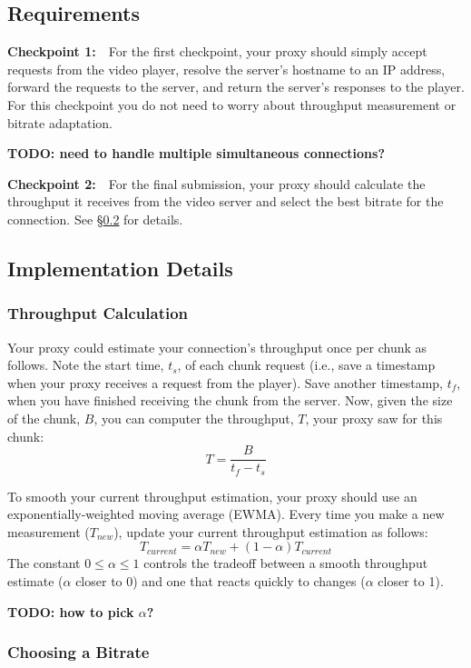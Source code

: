 \documentclass{article}
\begin{document}
\subsection{Requirements}

\bigskip \noindent \textbf{Checkpoint 1:}~~For the first checkpoint, your proxy
should simply accept requests from the video player, resolve the server's
hostname to an IP address, forward the requests to the server, and return the
server's responses to the player. For this checkpoint you do not need to worry
about throughput measurement or bitrate adaptation.

\textbf{TODO: need to handle multiple simultaneous connections?}


\bigskip \noindent \textbf{Checkpoint 2:}~~For the final submission, your proxy
should calculate the throughput it receives from the video server and select
the best bitrate for the connection. See \S\ref{sec:proxy-details} for details.


\subsection{Implementation Details}
\label{sec:proxy-details}

\subsubsection{Throughput Calculation}
Your proxy could estimate your connection's throughput once per chunk as
follows. Note the start time, $t_s$, of each chunk request (i.e., save a
timestamp when your proxy receives a request from the player). Save another
timestamp, $t_f$, when you have finished receiving the chunk from the server.
Now, given the size of the chunk, $B$, you can computer the throughput, $T$,
your proxy saw for this chunk:
\[
	T = \frac{B}{t_f - t_s}
\]


To smooth your current throughput estimation, your proxy should use an
exponentially-weighted moving average (EWMA). Every time you make a new
measurement ($T_{new}$), update your current throughput estimation as follows:
\[
	T_{current} = \alpha T_{new}  +  (1 - \alpha)T_{current}
\]
The constant $0 \leq \alpha \leq 1$ controls the tradeoff between a smooth
throughput estimate ($\alpha$ closer to 0) and one that reacts quickly to
changes ($\alpha$ closer to 1).

\textbf{TODO: how to pick $\alpha$?}



\subsubsection{Choosing a Bitrate}
\end{document}
